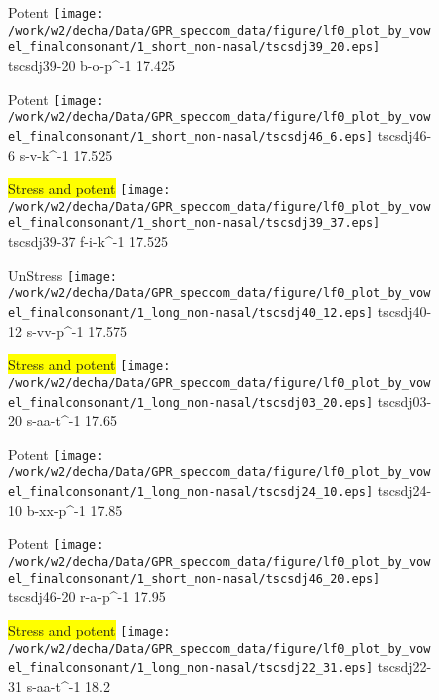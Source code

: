 \documentclass{article}
\begin{document}
\begin{figure}[t]
\begin{minipage}[b]{.24\textwidth}
\colorbox{Apricot}{Potent}
\centering
\texttt{[image: /work/w2/decha/Data/GPR\_speccom\_data/figure/lf0\_plot\_by\_vowel\_finalconsonant/1\_short\_non-nasal/tscsdj39\_20.eps]}
tscsdj39-20 b-o-p\textasciicircum-1 17.425
\end{minipage}
\begin{minipage}[b]{.24\textwidth}
\colorbox{Apricot}{Potent}
\centering
\texttt{[image: /work/w2/decha/Data/GPR\_speccom\_data/figure/lf0\_plot\_by\_vowel\_finalconsonant/1\_short\_non-nasal/tscsdj46\_6.eps]}
tscsdj46-6 s-v-k\textasciicircum-1 17.525
\end{minipage}
\begin{minipage}[b]{.24\textwidth}
\colorbox{yellow}{Stress and potent}
\centering
\texttt{[image: /work/w2/decha/Data/GPR\_speccom\_data/figure/lf0\_plot\_by\_vowel\_finalconsonant/1\_short\_non-nasal/tscsdj39\_37.eps]}
tscsdj39-37 f-i-k\textasciicircum-1 17.525
\end{minipage}
\begin{minipage}[b]{.24\textwidth}
UnStress
\centering
\texttt{[image: /work/w2/decha/Data/GPR\_speccom\_data/figure/lf0\_plot\_by\_vowel\_finalconsonant/1\_long\_non-nasal/tscsdj40\_12.eps]}
tscsdj40-12 s-vv-p\textasciicircum-1 17.575
\end{minipage}
\end{figure}

\begin{figure}[t]
\begin{minipage}[b]{.24\textwidth}
\colorbox{yellow}{Stress and potent}
\centering
\texttt{[image: /work/w2/decha/Data/GPR\_speccom\_data/figure/lf0\_plot\_by\_vowel\_finalconsonant/1\_long\_non-nasal/tscsdj03\_20.eps]}
tscsdj03-20 s-aa-t\textasciicircum-1 17.65
\end{minipage}
\begin{minipage}[b]{.24\textwidth}
\colorbox{Apricot}{Potent}
\centering
\texttt{[image: /work/w2/decha/Data/GPR\_speccom\_data/figure/lf0\_plot\_by\_vowel\_finalconsonant/1\_long\_non-nasal/tscsdj24\_10.eps]}
tscsdj24-10 b-xx-p\textasciicircum-1 17.85
\end{minipage}
\begin{minipage}[b]{.24\textwidth}
\colorbox{Apricot}{Potent}
\centering
\texttt{[image: /work/w2/decha/Data/GPR\_speccom\_data/figure/lf0\_plot\_by\_vowel\_finalconsonant/1\_short\_non-nasal/tscsdj46\_20.eps]}
tscsdj46-20 r-a-p\textasciicircum-1 17.95
\end{minipage}
\begin{minipage}[b]{.24\textwidth}
\colorbox{yellow}{Stress and potent}
\centering
\texttt{[image: /work/w2/decha/Data/GPR\_speccom\_data/figure/lf0\_plot\_by\_vowel\_finalconsonant/1\_long\_non-nasal/tscsdj22\_31.eps]}
tscsdj22-31 s-aa-t\textasciicircum-1 18.2
\end{minipage}
\end{figure}
\end{document}
